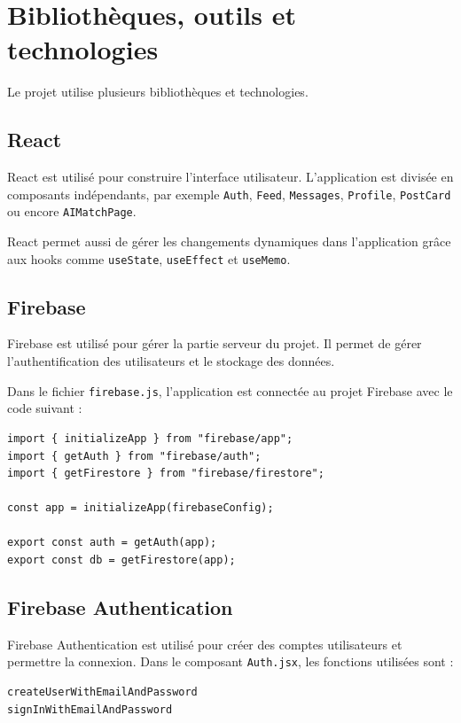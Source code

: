 \documentclass[a4paper, 12pt, twoside]{article}
\begin{document}
\section{Bibliothèques, outils et technologies}

Le projet utilise plusieurs bibliothèques et technologies.

\subsection{React}

React est utilisé pour construire l'interface utilisateur. 
L'application est divisée en composants indépendants, par exemple \texttt{Auth}, \texttt{Feed}, \texttt{Messages}, \texttt{Profile}, \texttt{PostCard} ou encore \texttt{AIMatchPage}.

React permet aussi de gérer les changements dynamiques dans l'application grâce aux hooks comme \texttt{useState}, \texttt{useEffect} et \texttt{useMemo}.

\subsection{Firebase}

Firebase est utilisé pour gérer la partie serveur du projet. 
Il permet de gérer l'authentification des utilisateurs et le stockage des données.

Dans le fichier \texttt{firebase.js}, l'application est connectée au projet Firebase avec le code suivant :

\begin{lstlisting}
import { initializeApp } from "firebase/app";
import { getAuth } from "firebase/auth";
import { getFirestore } from "firebase/firestore";

const app = initializeApp(firebaseConfig);

export const auth = getAuth(app);
export const db = getFirestore(app);
\end{lstlisting}

\subsection{Firebase Authentication}

Firebase Authentication est utilisé pour créer des comptes utilisateurs et permettre la connexion. 
Dans le composant \texttt{Auth.jsx}, les fonctions utilisées sont :

\begin{lstlisting}
createUserWithEmailAndPassword
signInWithEmailAndPassword
\end{lstlisting}
\end{document}
